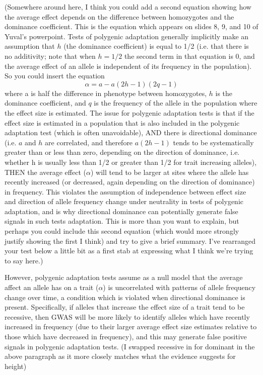 \documentclass[a4paper,10pt]{article}
\newcommand{\jb}[1]{{\color{blue} (#1)} }
\begin{document}
\jb{Somewhere around here, I think you could add a second equation showing how the average effect depends on the difference between
  homozygotes and the dominance coefficient. This is the equation which appears on slides 8, 9, and 10 of Yuval's powerpoint.
  Tests of polygenic adaptation generally implicitly make an assumption that $h$ (the dominance coefficient) is equal to 1/2
  (i.e. that there is no additivity; note that when $h=1/2$ the second term in that equation is $0$, and the average effect
  of an allele is independent of its frequency in the population). So you could insert the equation
  \begin{equation}
    \alpha = a - a(2h-1)(2q-1)
  \end{equation}
  where a is half the difference in phenotype between homozygotes, $h$ is the dominance coefficient, and $q$ is the frequency of
  the allele in the population where the effect size is estimated. The issue for polygenic adaptation tests is that if the effect
  size is estimated in a population that is also included in the polygenic adaptation test (which is often unavoidable), AND there
  is directional dominance (i.e. $a$ and $h$ are correlated, and therefore $a(2h-1)$ tends to be systematically greater than or
  less than zero, depending on the direction of dominance, i.e. whether h is usually less than 1/2 or greater than 1/2 for trait
  increasing alleles), THEN the average effect ($\alpha$) will tend to be larger at sites where the allele has recently increased
  (or decreased, again depending on the direction of dominance) in frequency. This violates the assumption of independence between
  effect size and direction of allele frequency change under neutrality in  tests of polygenic adaptation, and is why directional
  dominance can potentially generate false signals in such tests adaptation. This is more than you want to explain, but perhaps you
  could include this second equation (which would more strongly justify showing the first I think) and try to give a brief summary.
  I've rearranged your test below a little bit as a first stab at expressing what I think we're trying to say here.}

However, polygenic adaptation tests assume as a null model that the
average affect an allele has on a trait ($\alpha$) is uncorrelated with patterns of allele frequency change over time, a condition
which is violated when directional dominance is present. Specifically, if alleles that increase the effect
size of a trait tend to be recessive, then GWAS will be more likely to identify alleles which have recently increased in frequency
(due to their larger average effect size estimates relative to those which have decreased in frequency), and this may generate false positive
signals in polygenic adaptation tests.
\jb{I swapped recessive in for dominant in the above paragraph as it more closely matches what the evidence suggests for height}
\end{document}
